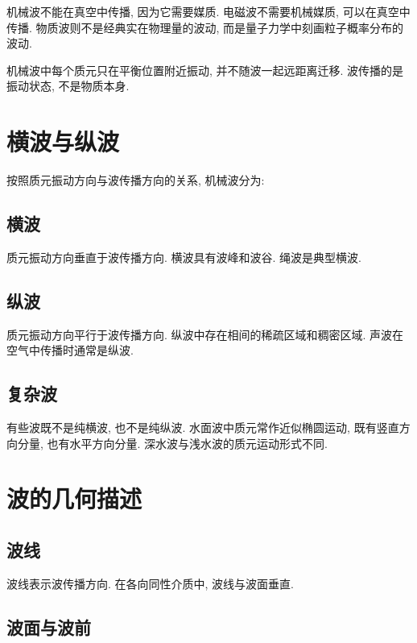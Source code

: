 \documentclass[
  a4paper,
]{ctexrep}
\begin{document}
机械波不能在真空中传播, 因为它需要媒质. 电磁波不需要机械媒质,
可以在真空中传播. 物质波则不是经典实在物理量的波动,
而是量子力学中刻画粒子概率分布的波动.

机械波中每个质元只在平衡位置附近振动, 并不随波一起远距离迁移.
波传播的是振动状态, 不是物质本身.

\section{横波与纵波}\label{ux6a2aux6ce2ux4e0eux7eb5ux6ce2}

按照质元振动方向与波传播方向的关系, 机械波分为:

\subsection{横波}\label{ux6a2aux6ce2}

质元振动方向垂直于波传播方向. 横波具有波峰和波谷. 绳波是典型横波.

\subsection{纵波}\label{ux7eb5ux6ce2}

质元振动方向平行于波传播方向. 纵波中存在相间的稀疏区域和稠密区域.
声波在空气中传播时通常是纵波.

\subsection{复杂波}\label{ux590dux6742ux6ce2}

有些波既不是纯横波, 也不是纯纵波. 水面波中质元常作近似椭圆运动,
既有竖直方向分量, 也有水平方向分量. 深水波与浅水波的质元运动形式不同.

\section{波的几何描述}\label{ux6ce2ux7684ux51e0ux4f55ux63cfux8ff0}

\subsection{波线}\label{ux6ce2ux7ebf}

波线表示波传播方向. 在各向同性介质中, 波线与波面垂直.

\subsection{波面与波前}\label{ux6ce2ux9762ux4e0eux6ce2ux524d}
\end{document}
